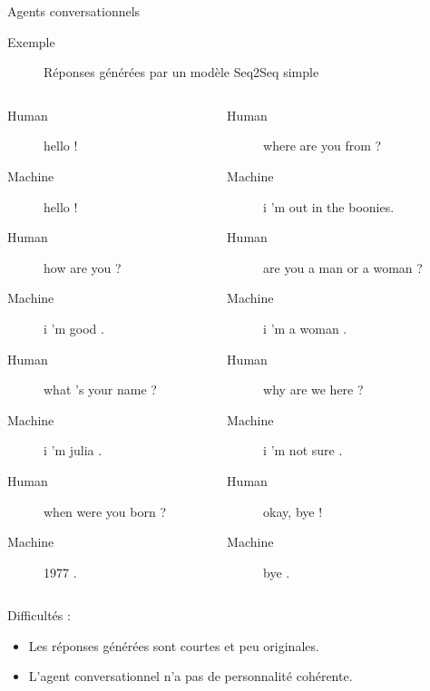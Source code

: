 \documentclass[french]{beamer}
\begin{document}
\begin{frame}{Agents conversationnels}
\begin{description}
	\item [Exemple] Réponses générées par un modèle Seq2Seq simple \cite{vinyals2015neural}
\end{description}
\vspace{-.3cm}
\begin{columns}[T] %
\begin{column}{.48\textwidth}

\begin{description}
	\item [Human] hello !
	\item [Machine] hello !
	\item [Human] how are you ?
	\item [Machine] i ’m good .
	\item [Human] what ’s your name ?
	\item [Machine] i ’m julia .
	\item [Human] when were you born ?
	\item [Machine] 1977 .
\end{description}

\end{column}%
\hfill%
\begin{column}{.58\textwidth}
\begin{description}
	\item [Human] where are you from ?
	\item [Machine] i ’m out in the boonies.
	\item [Human] are you a man or a woman ?
	\item [Machine] i ’m a woman .
	\item [Human] why are we here ?
	\item [Machine] i ’m not sure .
	\item [Human] okay, bye !
	\item [Machine] bye .
\end{description}
\end{column}%
\end{columns}

\vspace{.3cm}
Difficultés : 

\begin{itemize}
	\item Les réponses générées sont courtes et peu originales.
	\item L'agent conversationnel n'a pas de personnalité cohérente.
\end{itemize}
\end{frame}
\end{document}
